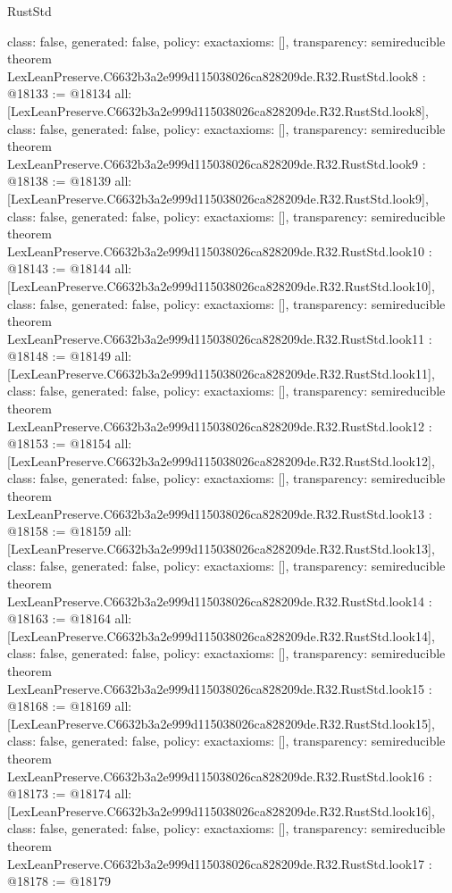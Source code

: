 \begin{lexlean}{RustStd}
\begin{coremodule}
{  class: false,
  generated: false,
  policy: exact{axioms: []},
  transparency: semireducible
}
theorem LexLeanPreserve.C6632b3a2e999d115038026ca828209de.R32.RustStd.look8 : @18133 := @18134 {
  all: [LexLeanPreserve.C6632b3a2e999d115038026ca828209de.R32.RustStd.look8],
  class: false,
  generated: false,
  policy: exact{axioms: []},
  transparency: semireducible
}
theorem LexLeanPreserve.C6632b3a2e999d115038026ca828209de.R32.RustStd.look9 : @18138 := @18139 {
  all: [LexLeanPreserve.C6632b3a2e999d115038026ca828209de.R32.RustStd.look9],
  class: false,
  generated: false,
  policy: exact{axioms: []},
  transparency: semireducible
}
theorem LexLeanPreserve.C6632b3a2e999d115038026ca828209de.R32.RustStd.look10 : @18143 := @18144 {
  all: [LexLeanPreserve.C6632b3a2e999d115038026ca828209de.R32.RustStd.look10],
  class: false,
  generated: false,
  policy: exact{axioms: []},
  transparency: semireducible
}
theorem LexLeanPreserve.C6632b3a2e999d115038026ca828209de.R32.RustStd.look11 : @18148 := @18149 {
  all: [LexLeanPreserve.C6632b3a2e999d115038026ca828209de.R32.RustStd.look11],
  class: false,
  generated: false,
  policy: exact{axioms: []},
  transparency: semireducible
}
theorem LexLeanPreserve.C6632b3a2e999d115038026ca828209de.R32.RustStd.look12 : @18153 := @18154 {
  all: [LexLeanPreserve.C6632b3a2e999d115038026ca828209de.R32.RustStd.look12],
  class: false,
  generated: false,
  policy: exact{axioms: []},
  transparency: semireducible
}
theorem LexLeanPreserve.C6632b3a2e999d115038026ca828209de.R32.RustStd.look13 : @18158 := @18159 {
  all: [LexLeanPreserve.C6632b3a2e999d115038026ca828209de.R32.RustStd.look13],
  class: false,
  generated: false,
  policy: exact{axioms: []},
  transparency: semireducible
}
theorem LexLeanPreserve.C6632b3a2e999d115038026ca828209de.R32.RustStd.look14 : @18163 := @18164 {
  all: [LexLeanPreserve.C6632b3a2e999d115038026ca828209de.R32.RustStd.look14],
  class: false,
  generated: false,
  policy: exact{axioms: []},
  transparency: semireducible
}
theorem LexLeanPreserve.C6632b3a2e999d115038026ca828209de.R32.RustStd.look15 : @18168 := @18169 {
  all: [LexLeanPreserve.C6632b3a2e999d115038026ca828209de.R32.RustStd.look15],
  class: false,
  generated: false,
  policy: exact{axioms: []},
  transparency: semireducible
}
theorem LexLeanPreserve.C6632b3a2e999d115038026ca828209de.R32.RustStd.look16 : @18173 := @18174 {
  all: [LexLeanPreserve.C6632b3a2e999d115038026ca828209de.R32.RustStd.look16],
  class: false,
  generated: false,
  policy: exact{axioms: []},
  transparency: semireducible
}
theorem LexLeanPreserve.C6632b3a2e999d115038026ca828209de.R32.RustStd.look17 : @18178 := @18179 {
}
\end{coremodule}
\end{lexlean}
